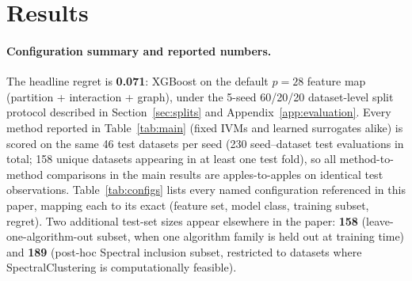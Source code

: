 \documentclass[10pt]{article} %
\begin{document}
\section{Results}
\label{sec:results}

\paragraph{Configuration summary and reported numbers.} The headline regret is \textbf{0.071}: XGBoost on the default $p = 28$ feature map (partition + interaction + graph), under the 5-seed 60/20/20 dataset-level split protocol described in Section~\ref{sec:splits} and Appendix~\ref{app:evaluation}. Every method reported in Table~\ref{tab:main} (fixed IVMs and learned surrogates alike) is scored on the same 46 test datasets per seed (230 seed--dataset test evaluations in total; 158 unique datasets appearing in at least one test fold), so all method-to-method comparisons in the main results are apples-to-apples on identical test observations. Table~\ref{tab:configs} lists every named configuration referenced in this paper, mapping each to its exact (feature set, model class, training subset, regret). Two additional test-set sizes appear elsewhere in the paper: \textbf{158} (leave-one-algorithm-out subset, when one algorithm family is held out at training time) and \textbf{189} (post-hoc Spectral inclusion subset, restricted to datasets where SpectralClustering is computationally feasible).
\end{document}
